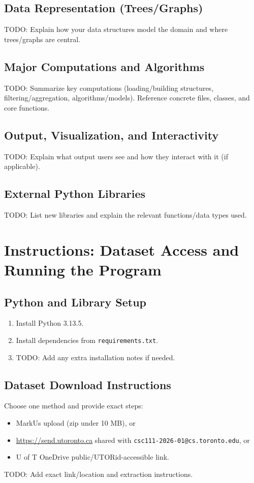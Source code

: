 \documentclass[12pt]{article}
\begin{document}
\subsection{Data Representation (Trees/Graphs)}
TODO: Explain how your data structures model the domain and where trees/graphs are central.

\subsection{Major Computations and Algorithms}
TODO: Summarize key computations (loading/building structures, filtering/aggregation, algorithms/models).
Reference concrete files, classes, and core functions.

\subsection{Output, Visualization, and Interactivity}
TODO: Explain what output users see and how they interact with it (if applicable).

\subsection{External Python Libraries}
TODO: List new libraries and explain the relevant functions/data types used.

\section{Instructions: Dataset Access and Running the Program}
\subsection{Python and Library Setup}
\begin{enumerate}[leftmargin=*]
    \item Install Python 3.13.5.
    \item Install dependencies from \texttt{requirements.txt}.
    \item TODO: Add any extra installation notes if needed.
\end{enumerate}

\subsection{Dataset Download Instructions}
Choose one method and provide exact steps:
\begin{itemize}[leftmargin=*]
    \item MarkUs upload (zip under 10 MB), or
    \item \url{https://send.utoronto.ca} shared with \texttt{csc111-2026-01@cs.toronto.edu}, or
    \item U of T OneDrive public/UTORid-accessible link.
\end{itemize}
TODO: Add exact link/location and extraction instructions.
\end{document}
